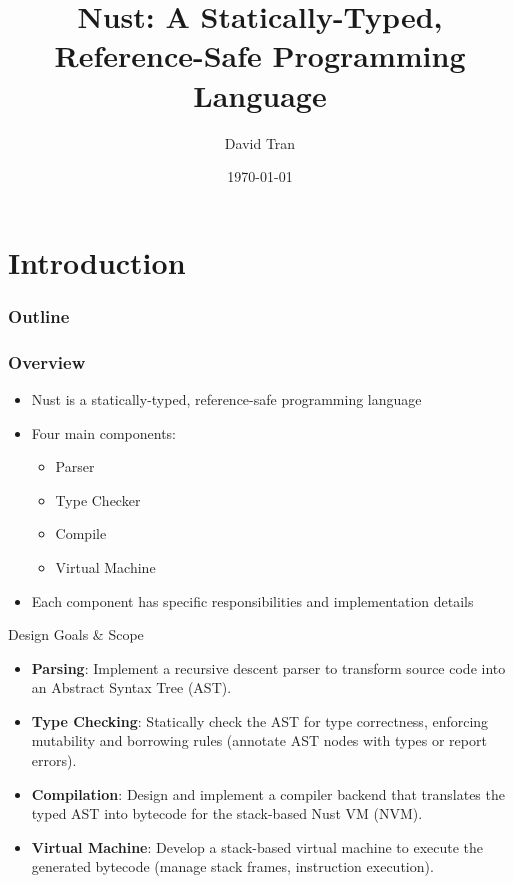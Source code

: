 \documentclass{beamer}
\title{Nust: A Statically-Typed, Reference-Safe Programming Language}
\author{David Tran}
\date{\today}
\begin{document}
\frame{\titlepage}

\section{Introduction}
\begin{frame}
\frametitle{Outline}
\tableofcontents
\end{frame}

\begin{frame}
\frametitle{Overview}
\begin{itemize}
    \item Nust is a statically-typed, reference-safe programming language
    \item Four main components:
    \begin{itemize}
        \item Parser
        \item Type Checker
        \item Compile
        \item Virtual Machine
    \end{itemize}
    \item Each component has specific responsibilities and implementation details
\end{itemize}
\end{frame}

\begin{frame}{Design Goals \& Scope}
    \begin{itemize}
      \item \textbf{Parsing}: Implement a recursive descent parser to transform source code into an Abstract Syntax Tree (AST).
      \item \textbf{Type Checking}: Statically check the AST for type correctness, enforcing mutability and borrowing rules (annotate AST nodes with types or report errors).
      \item \textbf{Compilation}: Design and implement a compiler backend that translates the typed AST into bytecode for the stack-based Nust VM (NVM).
      \item \textbf{Virtual Machine}: Develop a stack-based virtual machine to execute the generated bytecode (manage stack frames, instruction execution).
    \end{itemize}
  \end{frame}
\end{document}

